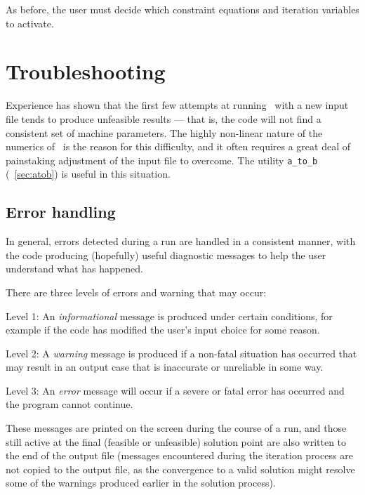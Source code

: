 As before, the user must decide which constraint equations and iteration
variables to activate.


\section{Troubleshooting}
\label{sec:problems}

Experience has shown that the first few attempts at running \process\ with a
new input file tends to produce unfeasible results --- that is, the code will
not find a consistent set of machine parameters. The highly non-linear nature
of the numerics of \process\ is the reason for this difficulty, and it often
requires a great deal of painstaking adjustment of the input file to overcome.  The utility
\texttt{a\_to\_b} (~\autoref{sec:atob}) is useful in this situation.

\subsection{Error handling}
\label{sec:errors}

In general, errors detected during a run are handled in a consistent manner,
with the code producing (hopefully) useful diagnostic messages to help the
user understand what has happened.

There are three levels of errors and warning that may occur:
\begin{description}

\item{Level 1:} An \textit{informational}\/ message is produced under certain
  conditions, for example if the code has modified the user's input choice for
  some reason.

\item{Level 2:} A \textit{warning}\/ message is produced if a non-fatal situation has
  occurred that may result in an output case that is inaccurate or
  unreliable in some way.

\item{Level 3:} An \textit{error}\/ message will occur if a severe or fatal
  error has occurred and the program cannot continue.

\end{description}

These messages are printed on the screen during the course of a run, and those
still active at the final (feasible or unfeasible) solution point are also
written to the end of the output file (messages encountered during the
iteration process are not copied to the output file, as the convergence to a
valid solution might resolve some of the warnings produced earlier in the
solution process).

